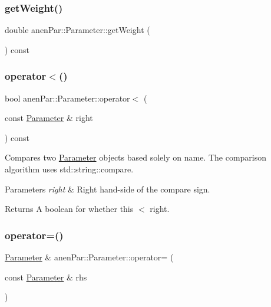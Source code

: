\subsubsection{\texorpdfstring{get\+Weight()}{getWeight()}}
{\footnotesize\ttfamily double anen\+Par\+::\+Parameter\+::get\+Weight (\begin{DoxyParamCaption}{ }\end{DoxyParamCaption}) const}

\mbox{\label{classanen_par_1_1_parameter_ab7997cdf149d06b8649754dab02ea4dc}} 
\subsubsection{\texorpdfstring{operator$<$()}{operator<()}}
{\footnotesize\ttfamily bool anen\+Par\+::\+Parameter\+::operator$<$ (\begin{DoxyParamCaption}\item[{const \mbox{\hyperlink{classanen_par_1_1_parameter}{Parameter}} \&}]{right }\end{DoxyParamCaption}) const}

Compares two \mbox{\hyperlink{classanen_par_1_1_parameter}{Parameter}} objects based solely on name. The comparison algorithm uses std\+::string\+::compare.


\begin{DoxyParams}{Parameters}
{\em right} & Right hand-\/side of the compare sign. \\
\hline
\end{DoxyParams}
\begin{DoxyReturn}{Returns}
A boolean for whether this $<$ right. 
\end{DoxyReturn}
\mbox{\label{classanen_par_1_1_parameter_aebba3af3376eb06f763e3b6d46e68b56}} 
\subsubsection{\texorpdfstring{operator=()}{operator=()}}
{\footnotesize\ttfamily \mbox{\hyperlink{classanen_par_1_1_parameter}{Parameter}} \& anen\+Par\+::\+Parameter\+::operator= (\begin{DoxyParamCaption}\item[{const \mbox{\hyperlink{classanen_par_1_1_parameter}{Parameter}} \&}]{rhs }\end{DoxyParamCaption})}

